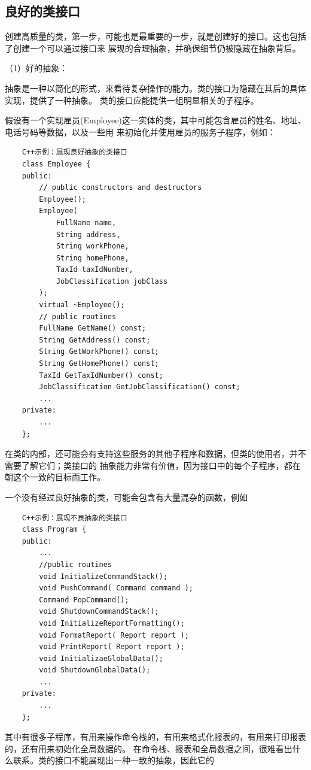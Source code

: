 \documentclass{article}
\begin{document}
\subsection{良好的类接口}
创建高质量的类，第一步，可能也是最重要的一步，就是创建好的接口。这也包括了创建一个可以通过接口来
展现的合理抽象，并确保细节仍被隐藏在抽象背后。
\par
（1）好的抽象：
\par
抽象是一种以简化的形式，来看待复杂操作的能力。类的接口为隐藏在其后的具体实现，提供了一种抽象。
类的接口应能提供一组明显相关的子程序。
\par
假设有一个实现雇员(Employee)这一实体的类，其中可能包含雇员的姓名、地址、电话号码等数据，以及一些用
来初始化并使用雇员的服务子程序，例如：
\begin{lstlisting}
    C++示例：展现良好抽象的类接口
    class Employee {
    public:
        // public constructors and destructors
        Employee();
        Employee(
            FullName name,
            String address,
            String workPhone,
            String homePhone,
            TaxId taxIdNumber,
            JobClassification jobClass
        );
        virtual ~Employee();
        // public routines
        FullName GetName() const;
        String GetAddress() const;
        String GetWorkPhone() const;
        String GetHomePhone() const;
        TaxId GetTaxIdNumber() const;
        JobClassification GetJobClassification() const;
        ...
    private:
        ...
    };
\end{lstlisting}
在类的内部，还可能会有支持这些服务的其他子程序和数据，但类的使用者，并不需要了解它们；类接口的
抽象能力非常有价值，因为接口中的每个子程序，都在朝这个一致的目标而工作。
\par
一个没有经过良好抽象的类，可能会包含有大量混杂的函数，例如
\begin{lstlisting}
    C++示例：展现不良抽象的类接口
    class Program {
    public:
        ...
        //public routines
        void InitializeCommandStack();
        void PushCommand( Command command );
        Command PopCommand();
        void ShutdownCommandStack();
        void InitializeReportFormatting();
        void FormatReport( Report report );
        void PrintReport( Report report );
        void InitializaeGlobalData();
        void ShutdownGlobalData();
        ...
    private:
        ...
    };
\end{lstlisting}
其中有很多子程序，有用来操作命令栈的，有用来格式化报表的，有用来打印报表的，还有用来初始化全局数据的。
在命令栈、报表和全局数据之间，很难看出什么联系。类的接口不能展现出一种一致的抽象，因此它的
\end{document}
